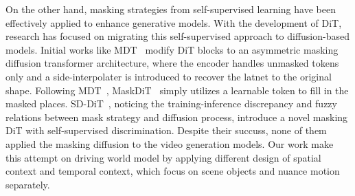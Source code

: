 On the other hand, masking strategies from self-supervised learning have been effectively applied to enhance generative models. 
With the development of DiT, research has focused on migrating this self-supervised approach to diffusion-based models. 
Initial works like MDT~\cite{mdt} modify DiT blocks to an asymmetric masking diffusion transformer architecture, where the encoder handles unmasked tokens only and a side-interpolater is introduced to recover the latnet to the original shape. 
Following MDT~\cite{mdt}, MaskDiT~\cite{maskdit} 
simply utilizes a learnable token to fill in the masked places. 
SD-DiT~\cite{sd_dit}, noticing the training-inference discrepancy and fuzzy relations between mask strategy and diffusion process, introduce a novel masking DiT with self-supervised discrimination.
Despite their succuss, none of them applied the masking diffusion to the video generation models. Our work make this attempt on driving world model by applying different design of spatial context and temporal context, which focus on scene objects and nuance motion separately.